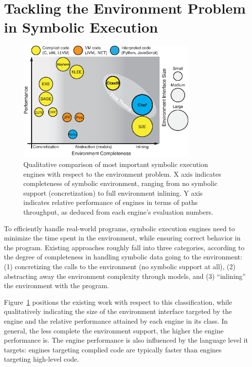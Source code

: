 \section{Tackling the Environment Problem in Symbolic Execution}
\label{sec:relwork:envproblem}

\begin{figure}
  \centering
  \includegraphics[width=0.8\textwidth]{figures/relwork/relwork-positioning}
  \caption{Qualitative comparison of most important symbolic execution engines with respect to the environment problem. X axis indicates completeness of symbolic environment, ranging from no symbolic support (concretization) to full environment inlining.  Y axis indicates relative performance of engines in terms of paths throughput, as deduced from each engine's evaluation numbers.}
  \label{fig:relwork:positioning}
\end{figure}

To efficiently handle real-world programs, symbolic execution engines need to minimize the time spent in the environment, while ensuring correct behavior in the program.
%
Existing approaches roughly fall into three categories, according to the degree of completeness in handling symbolic data going to the environment: (1) concretizing the calls to the environment (no symbolic support at all), (2) abstracting away the environment complexity through models, and (3) ``inlining'' the environment with the program.

Figure~\ref{fig:relwork:positioning} positions the existing work with respect to this classification, while qualitatively indicating the size of the environment interface targeted by the engine and the relative performance attained by each engine in its class.
%
In general, the less complete the environment support, the higher the engine performance is.  The engine performance is also influenced by the language level it targets: engines targeting complied code are typically faster than engines targeting high-level code.

